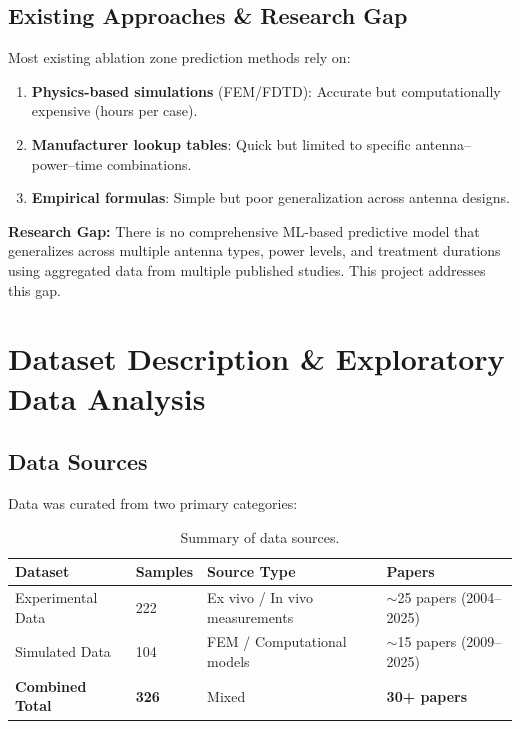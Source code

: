 \documentclass[12pt, a4paper]{article}
\begin{document}
\subsection{Existing Approaches \& Research Gap}
\label{sec:research-gap}

Most existing ablation zone prediction methods rely on:

\begin{enumerate}
    \item \textbf{Physics-based simulations} (FEM/FDTD): Accurate but computationally expensive (hours per case).
    \item \textbf{Manufacturer lookup tables}: Quick but limited to specific antenna--power--time combinations.
    \item \textbf{Empirical formulas}: Simple but poor generalization across antenna designs.
\end{enumerate}

\textbf{Research Gap:} There is no comprehensive ML-based predictive model that generalizes across multiple antenna types, power levels, and treatment durations using aggregated data from multiple published studies. This project addresses this gap.

\section{Dataset Description \& Exploratory Data Analysis}
\label{sec:eda}

\subsection{Data Sources}
\label{sec:data-sources}

Data was curated from two primary categories:

\begin{table}[H]
\centering
\caption{Summary of data sources.}
\label{tab:data-sources}
\begin{tabular}{@{}llll@{}}
\toprule
\textbf{Dataset} & \textbf{Samples} & \textbf{Source Type} & \textbf{Papers} \\
\midrule
Experimental Data & 222 & Ex vivo / In vivo measurements & $\sim$25 papers (2004--2025) \\
Simulated Data    & 104 & FEM / Computational models     & $\sim$15 papers (2009--2025) \\
\midrule
\textbf{Combined Total} & \textbf{326} & Mixed & \textbf{30+ papers} \\
\bottomrule
\end{tabular}
\end{table}
\end{document}
